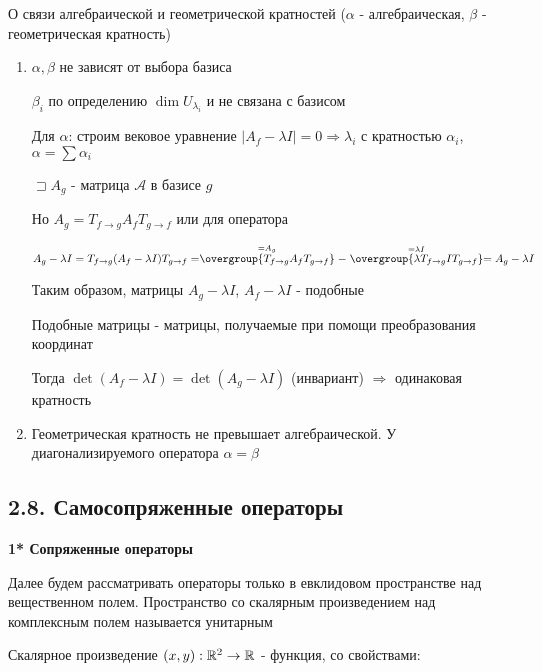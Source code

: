 \documentclass[12pt]{article}
\begin{document}
    \Nota О связи алгебраической и геометрической кратностей ($\alpha$ - алгебраическая, $\beta$ - геометрическая кратность)

    \begin{enumerate}
        \item $\alpha, \beta$ не зависят от выбора базиса

        \begin{MyProof}
            $\beta_i$ по определению $\dim U_{\lambda_i}$ и не связана с базисом

            Для $\alpha$: строим вековое уравнение $|A_f - \lambda I| = 0 \Longrightarrow \lambda_i$ с кратностью $\alpha_i$, $\alpha = \sum \alpha_i$

            $\sqsupset A_g$ - матрица $\mathcal{A}$ в базисе $g$

            Но $A_g = T_{f\to g} A_f T_{g\to f}$ или для оператора

            $A_g - \lambda I = T_{f\to g} (A_f - \lambda I) T_{g\to f} =
            \stackrel{= A_g}{\overgroup{T_{f\to g} A_f T_{g\to f}}} - \stackrel{= \lambda I}{\overgroup{\lambda T_{f\to g} I T_{g\to f}}} =
            A_g - \lambda I$

            Таким образом, матрицы $A_g - \lambda I$, $A_f - \lambda I$ - подобные

            \Def Подобные матрицы - матрицы, получаемые при помощи преобразования координат

            Тогда $\det (A_f - \lambda I) = \det (A_g - \lambda I)$ (инвариант) $\Longrightarrow$ одинаковая кратность

        \end{MyProof}

        \item Геометрическая кратность не превышает алгебраической. У диагонализируемого оператора $\alpha = \beta$
    \end{enumerate}

    \subsection[p2\_8]{2.8. Самосопряженные операторы}

    \textbf{1* Сопряженные операторы}

    Далее будем рассматривать операторы только в евклидовом пространстве над вещественном полем.
    Пространство со скалярным произведением над комплексным полем называется унитарным

    \Mem Скалярное произведение $(x, y) : \mathbb{R}^2 \rightarrow \mathbb{R}$ - функция, со свойствами:
\end{document}
